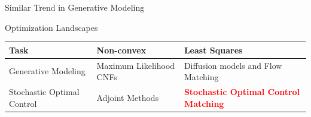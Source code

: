 \documentclass[aspectratio=169,xcolor=dvipsnames]{beamer}
\begin{document}
\begin{frame}{Similar Trend in Generative Modeling}
\end{frame}


\begin{frame}{Optimization Landscapes}
    \vspace{0.5cm}
    \begin{table}
        \centering
        \begin{tabular}{>{\centering\arraybackslash}p{}>{\centering\arraybackslash}p{}>{\centering\arraybackslash}p{}}
            \toprule
            \textbf{Task} & \textbf{Non-convex} & \textbf{Least Squares} \\
            \midrule
            Generative Modeling & Maximum Likelihood CNFs & Diffusion models and Flow Matching \\
            Stochastic Optimal Control & Adjoint Methods & \textcolor{red}{\textbf{Stochastic Optimal Control Matching}} \\
            \bottomrule
        \end{tabular}
    \end{table}
\end{frame}
\end{document}
